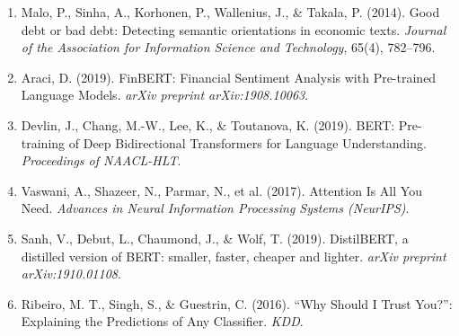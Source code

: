 \documentclass[12pt, a4paper]{article}
\begin{document}
\begin{enumerate}
  \item Malo, P., Sinha, A., Korhonen, P., Wallenius, J., \& Takala, P. (2014).
    Good debt or bad debt: Detecting semantic orientations in economic texts.
    \emph{Journal of the Association for Information Science and Technology},
    65(4), 782--796.
  \item Araci, D. (2019). FinBERT: Financial Sentiment Analysis with Pre-trained
    Language Models. \emph{arXiv preprint arXiv:1908.10063}.
  \item Devlin, J., Chang, M.-W., Lee, K., \& Toutanova, K. (2019). BERT:
    Pre-training of Deep Bidirectional Transformers for Language Understanding.
    \emph{Proceedings of NAACL-HLT}.
  \item Vaswani, A., Shazeer, N., Parmar, N., et al. (2017). Attention Is All
    You Need. \emph{Advances in Neural Information Processing Systems (NeurIPS)}.
  \item Sanh, V., Debut, L., Chaumond, J., \& Wolf, T. (2019). DistilBERT, a
    distilled version of BERT: smaller, faster, cheaper and lighter.
    \emph{arXiv preprint arXiv:1910.01108}.
  \item Ribeiro, M. T., Singh, S., \& Guestrin, C. (2016). ``Why Should I Trust
    You?'': Explaining the Predictions of Any Classifier. \emph{KDD}.
\end{enumerate}
\end{document}
